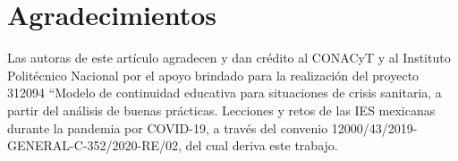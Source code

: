 \documentclass[spanish]{textolivre}
\begin{document}
\section*{Agradecimientos}
Las autoras de este artículo agradecen y dan crédito al CONACyT y al Instituto Politécnico Nacional por el apoyo brindado para la realización del proyecto 312094 “Modelo de continuidad educativa para situaciones de crisis sanitaria, a partir del análisis de buenas prácticas. Lecciones y retos de las IES mexicanas durante la pandemia por COVID-19, a través del convenio 12000/43/2019-GENERAL-C-352/2020-RE/02, del cual deriva este trabajo.


\printbibliography\label{sec-bib}
\end{document}
